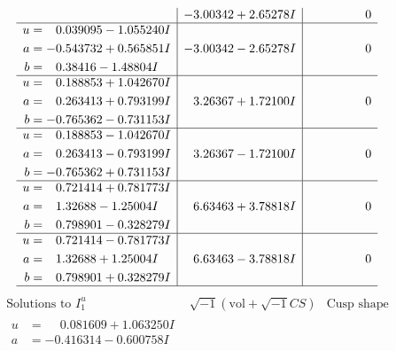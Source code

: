 \documentclass[1p]{elsarticle_modified}
\theoremstyle{definition}
\newcommand{\I}{\sqrt{-1}}
\begin{document}
$$\begin{array}{c|c|c}
 & -3.00342 + 2.65278 I & \phantom{-0.000000 } 0 \\ \hline\begin{aligned}
u &= \phantom{-}0.039095 - 1.055240 I \\
a &= -0.543732 + 0.565851 I \\
b &= \phantom{-}0.38416 - 1.48804 I\end{aligned}
 & -3.00342 - 2.65278 I & \phantom{-0.000000 } 0 \\ \hline\begin{aligned}
u &= \phantom{-}0.188853 + 1.042670 I \\
a &= \phantom{-}0.263413 + 0.793199 I \\
b &= -0.765362 - 0.731153 I\end{aligned}
 & \phantom{-}3.26367 + 1.72100 I & \phantom{-0.000000 } 0 \\ \hline\begin{aligned}
u &= \phantom{-}0.188853 - 1.042670 I \\
a &= \phantom{-}0.263413 - 0.793199 I \\
b &= -0.765362 + 0.731153 I\end{aligned}
 & \phantom{-}3.26367 - 1.72100 I & \phantom{-0.000000 } 0 \\ \hline\begin{aligned}
u &= \phantom{-}0.721414 + 0.781773 I \\
a &= \phantom{-}1.32688 - 1.25004 I \\
b &= \phantom{-}0.798901 - 0.328279 I\end{aligned}
 & \phantom{-}6.63463 + 3.78818 I & \phantom{-0.000000 } 0 \\ \hline\begin{aligned}
u &= \phantom{-}0.721414 - 0.781773 I \\
a &= \phantom{-}1.32688 + 1.25004 I \\
b &= \phantom{-}0.798901 + 0.328279 I\end{aligned}
 & \phantom{-}6.63463 - 3.78818 I & \phantom{-0.000000 } 0\\
 \hline 
 \end{array}$$\newpage$$\begin{array}{c|c|c}  
\text{Solutions to }I^u_{1}& \I (\text{vol} + \sqrt{-1}CS) & \text{Cusp shape}\\
 \hline 
\begin{aligned}
u &= \phantom{-}0.081609 + 1.063250 I \\
a &= -0.416314 - 0.600758 I \\

\end{aligned}
\end{array}$$
\end{document}
